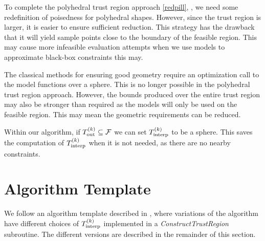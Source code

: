 To complete the polyhedral trust region approach \cref{redpill},
, we need some redefinition of poisedness for polyhedral shapes.
However, since the trust region is larger, it is easier to ensure sufficient reduction.
This strategy has the drawback that it will yield sample points close to the boundary of the feasible region.
This may cause more infeasible evaluation attempts when we use models to approximate black-box constraints this may.

The classical methods for ensuring good geometry require an optimization call to the model functions over a sphere.
This is no longer possible in the polyhedral trust region approach.
However, the bounds produced over the entire trust region may also be stronger than required as the models will only be used on the feasible region.
This may mean the geometric requirements can be reduced.

Within our algorithm, if $ {T_{\text{out}}^{(k)}} \subseteq {\mathcal F}$ we can set $ {T_{\text{interp}}^{(k)}} $ to be a sphere.
This saves the computation of $ {T_{\text{interp}}^{(k)}} $ when it is not needed, as there are no nearby constraints.







\section{Algorithm Template}

We follow an algorithm template described in \cite{doi:10.1080/10556788.2015.1026968}, where variations of the algorithm have different choices of $ {T_{\text{interp}}^{(k)}} $ implemented in a \emph{ConstructTrustRegion} subroutine.
The different versions are described in the remainder of this section.



